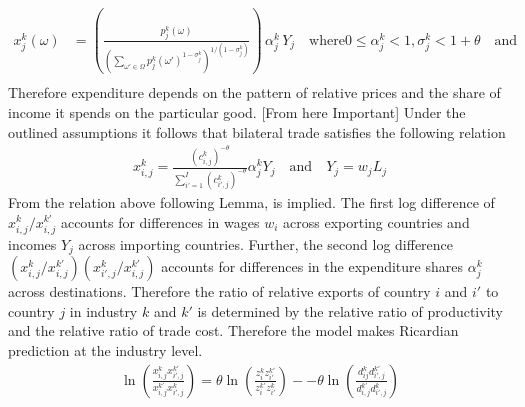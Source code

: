 \begin{align*}
x^k_{j}(\omega) &=  \left(\frac{ p^k_{j}(\omega) }  {  \left( \sum_{\omega' \in \Omega} {p_j^k (\omega')}^{1-\sigma_j^k } \right)^{1/(1-\sigma_j^k) }}    \right)\, \alpha^k_j \,Y_j \quad \text{where} 0 \leq \alpha_j^k < 1,\sigma_{j}^k<1+\theta \quad \text{and} \, \\
\end{align*}
Therefore  expenditure depends on the pattern of relative prices and the share of income it spends on the particular good. 
[From here Important]
Under the outlined assumptions it follows that bilateral trade satisfies the following relation \begin{align} x^k_{i,j}= \frac{(c^k_{i,j})^{ -\theta} } {\sum_{i'=1}^{I}(c^k_{i',j})^{-\theta } }  \alpha^k_j Y_j \quad \text{and}\quad Y_j=w_j  L_j \end{align}
From the relation above  following Lemma, is implied. The first log difference of ${x_{i,j}^k} /x_{i,j}^{k'}$ accounts for differences in wages $w_i$ across exporting countries and incomes $Y_j$ across importing countries. Further, the second log difference $\left({x_{i,j}^k} /x_{i,j}^{k'} \right)  \left({x_{i',j}^k} /x_{i,j}^{k'} \right) $ accounts for differences in the expenditure shares $\alpha^k_j$ across destinations. Therefore the ratio of relative exports of country $i$ and $i'$ to country $j$ in industry $k$ and $k'$ is determined by the relative ratio of productivity and the relative ratio of trade cost. Therefore the model  makes Ricardian prediction at the industry level. 
\begin{align} \ln \left( \frac{{x}_{i,j}^k {x}^{k'}_{i',j}}{{x}_{i,j}^{k'} {x}^{k}_{i',j}} \right) = \theta \ln \left( \frac{{z}_{i}^k {z}^{k'}_{i'}}{{z}_{i}^{k'} {z}^{k}_{i'}} \right)--\theta \ln \left( \frac{ d_{ij}^k d^{k'}_{i',j}}{d_{i,j}^{k'} {d}^{k}_{i',j}} \right) \end{align}

